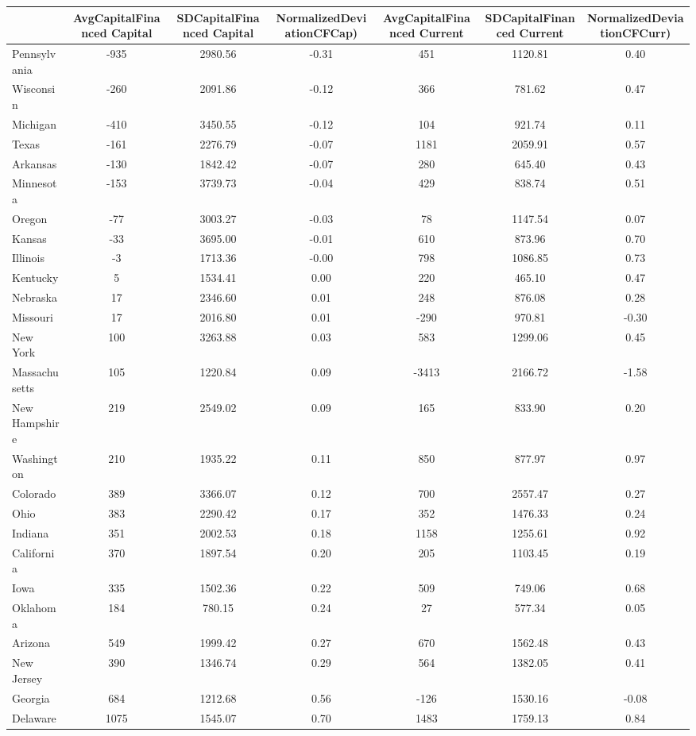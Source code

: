 \begin{tabularx}{\linewidth}{@{}lCCCCCC@{}}

\toprule
{}&{AvgCapitalFinanced Capital}&{SDCapitalFinanced Capital}&{NormalizedDeviationCFCap)}&{AvgCapitalFinanced Current}&{SDCapitalFinanced Current}&{NormalizedDeviationCFCurr)} \tabularnewline
\midrule \addlinespace[\belowrulesep]
Pennsylvania&-935&2980.56&-0.31&451&1120.81&0.40 \tabularnewline
Wisconsin&-260&2091.86&-0.12&366&781.62&0.47 \tabularnewline
Michigan&-410&3450.55&-0.12&104&921.74&0.11 \tabularnewline
Texas&-161&2276.79&-0.07&1181&2059.91&0.57 \tabularnewline
Arkansas&-130&1842.42&-0.07&280&645.40&0.43 \tabularnewline
Minnesota&-153&3739.73&-0.04&429&838.74&0.51 \tabularnewline
Oregon&-77&3003.27&-0.03&78&1147.54&0.07 \tabularnewline
Kansas&-33&3695.00&-0.01&610&873.96&0.70 \tabularnewline
Illinois&-3&1713.36&-0.00&798&1086.85&0.73 \tabularnewline
Kentucky&5&1534.41&0.00&220&465.10&0.47 \tabularnewline
Nebraska&17&2346.60&0.01&248&876.08&0.28 \tabularnewline
Missouri&17&2016.80&0.01&-290&970.81&-0.30 \tabularnewline
New York&100&3263.88&0.03&583&1299.06&0.45 \tabularnewline
Massachusetts&105&1220.84&0.09&-3413&2166.72&-1.58 \tabularnewline
New Hampshire&219&2549.02&0.09&165&833.90&0.20 \tabularnewline
Washington&210&1935.22&0.11&850&877.97&0.97 \tabularnewline
Colorado&389&3366.07&0.12&700&2557.47&0.27 \tabularnewline
Ohio&383&2290.42&0.17&352&1476.33&0.24 \tabularnewline
Indiana&351&2002.53&0.18&1158&1255.61&0.92 \tabularnewline
California&370&1897.54&0.20&205&1103.45&0.19 \tabularnewline
Iowa&335&1502.36&0.22&509&749.06&0.68 \tabularnewline
Oklahoma&184&780.15&0.24&27&577.34&0.05 \tabularnewline
Arizona&549&1999.42&0.27&670&1562.48&0.43 \tabularnewline
New Jersey&390&1346.74&0.29&564&1382.05&0.41 \tabularnewline
Georgia&684&1212.68&0.56&-126&1530.16&-0.08 \tabularnewline
Delaware&1075&1545.07&0.70&1483&1759.13&0.84 \tabularnewline
\bottomrule 

\end{tabularx}